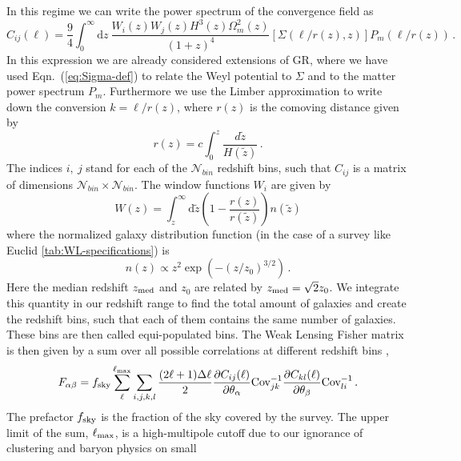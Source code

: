 In this regime we can write the power spectrum of the convergence field as
\begin{equation}
\label{def_shear}
C_{ij}(\ell)=\frac{9}{4}\int_{0}^{\infty}\mbox{d}z\:\frac{W_{i}(z)W_{j}(z)H^{3}(z)\Omega_{m}^{2}(z)}{(1+z)^{4}}\left[\Sigma(\ell/r(z),z)\right]P_{m}(\ell/r(z)) \, .
\end{equation}
In this expression we are already considered extensions of GR, 
where we have used Eqn.\ (\ref{eq:Sigma-def}) to relate the Weyl potential to $\Sigma$ and
to the matter power spectrum $P_m$. Furthermore we use the Limber approximation to write down the conversion $k=\ell/r(z)$, where $r(z)$ is the comoving
distance given by
\begin{equation}
r(z) = c\int_0^z \frac{d\tilde{z}}{H(\tilde{z})} \, .
\end{equation}
The indices $i,\:j$ stand for each of the $\mathcal{N}_{bin}$
redshift bins, such that $C_{ij}$ is a matrix of dimensions $\mathcal{N}_{bin}\times\mathcal{N}_{bin}$. The window functions $W_i$ are given by
\begin{equation}
W(z)=\int_{z}^{\infty}\mbox{d}\tilde{z}\left(1-\frac{r(z)}{r(\tilde{z})}\right)n(\tilde{z})
\end{equation}
where the normalized galaxy distribution function (in the case of a survey like Euclid \ref{tab:WL-specifications}) is
\begin{equation}
n(z)\propto z^{2}\exp\left(-(z/z_{0})^{3/2}\right) \, . \label{eq:ngal dist}
\end{equation}
Here the median redshift $z_{\rm med}$ and $z_{0}$ are related by $z_{\rm med}=\sqrt{2}z_{0}$.
We integrate this quantity in our redshift range to find the total amount of galaxies and
create the redshift bins, such that each of them contains the same number of galaxies. These bins
are then called equi-populated bins.
The Weak Lensing Fisher matrix is then 
given by a sum over all possible correlations at different redshift bins
\citep{tegmark_measuring_1998},
\begin{equation}
F_{\alpha\beta}=f_{\rm sky}\sum_{\ell}^{\ell_{\mathrm{max}}}\sum_{i,j,k,l}\frac{(2\ell+1)\Delta\ell}{2}\frac{\partial
C_{ij}(\ell)}{\partial\theta_{\alpha}}\textrm{Cov}_{jk}^{-1}\frac{\partial
C_{kl}(\ell)}{\partial\theta_{\beta}}\textrm{Cov}_{li}^{-1} \, . \label{eq:FisherSum-WL}
\end{equation}
The prefactor $f_{\rm sky}$ is the fraction of the sky covered by the survey. The upper limit of the sum, $\ell_{\mathrm{max}}$, is a high-multipole cutoff due to our ignorance of clustering and baryon physics on small
